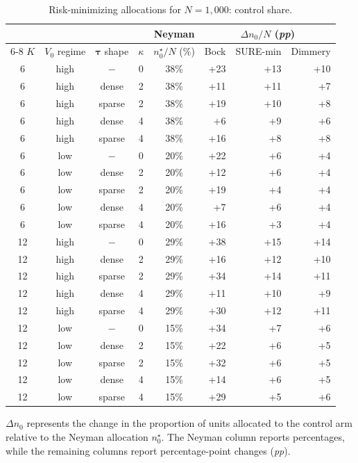 \documentclass{article}
\newcommand{\bstau}{\boldsymbol \tau}
\begin{document}
\begin{table}[ht]
\centering
\begin{threeparttable}
\caption{Risk-minimizing allocations for $N = 1{,}000$: control share.}
\label{tab:simAll_control}

\small
\setlength{\tabcolsep}{8pt}

\begin{tabular}{cccccrrr}
\toprule
& & & & \multicolumn{1}{c}{Neyman}
& \multicolumn{3}{c}{$\Delta n_0/N$ (\textit{pp})} \\
\cmidrule(lr){6-8}
$K$ & $V_0$ regime & $\bstau$ shape & $\kappa$
& $n_0^\star/N$ (\%)
& Bock & SURE-min & Dimmery \\
\midrule
6 & high & $-$ & 0 & 38\% & +23 & +13 & +10 \\
6 & high & dense & 2 & 38\% & +11 & +11 & +7 \\
6 & high & sparse & 2 & 38\% & +19 & +10 & +8 \\
6 & high & dense & 4 & 38\% & +6 & +9 & +6 \\
6 & high & sparse & 4 & 38\% & +16 & +8 & +8 \\
\midrule
6 & low & $-$ & 0 & 20\% & +22 & +6 & +4 \\
6 & low & dense & 2 & 20\% & +12 & +6 & +4 \\
6 & low & sparse & 2 & 20\% & +19 & +4 & +4 \\
6 & low & dense & 4 & 20\% & +7 & +6 & +4 \\
6 & low & sparse & 4 & 20\% & +16 & +3 & +4 \\
\midrule
12 & high & $-$ & 0 & 29\% & +38 & +15 & +14 \\
12 & high & dense & 2 & 29\% & +16 & +12 & +10 \\
12 & high & sparse & 2 & 29\% & +34 & +14 & +11 \\
12 & high & dense & 4 & 29\% & +11 & +10 & +9 \\
12 & high & sparse & 4 & 29\% & +30 & +12 & +11 \\
\midrule
12 & low & $-$ & 0 & 15\% & +34 & +7 & +6 \\
12 & low & dense & 2 & 15\% & +22 & +6 & +5 \\
12 & low & sparse & 2 & 15\% & +32 & +6 & +5 \\
12 & low & dense & 4 & 15\% & +14 & +6 & +5 \\
12 & low & sparse & 4 & 15\% & +29 & +5 & +6 \\
\bottomrule
\end{tabular}

\footnotesize
$\Delta n_0$ represents the change in the proportion of units allocated to the
control arm relative to the Neyman allocation $n_0^\star$. The Neyman column reports
percentages, while the remaining columns report percentage-point changes (\textit{pp}).

\end{threeparttable}
\end{table}
\end{document}
